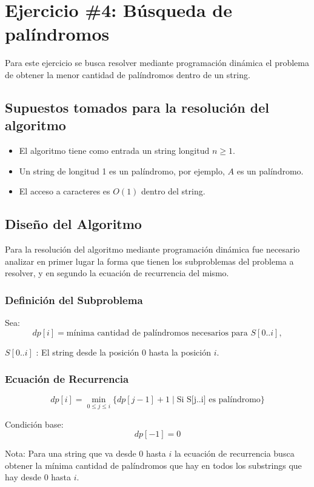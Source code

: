\section{Ejercicio \#4: Búsqueda de palíndromos}

Para este ejercicio se busca resolver mediante programación dinámica el problema de obtener la menor cantidad de palíndromos dentro de un string.

\subsection{Supuestos tomados para la resolución del algoritmo}

\begin{itemize}
    \item El algoritmo tiene como entrada un string longitud $n \geq 1$.
    \item Un string de longitud 1 es un palíndromo, por ejemplo, $A$ es un palíndromo.
    \item El acceso a caracteres es $O(1)$ dentro del string.
\end{itemize}

\subsection{Diseño del Algoritmo}

Para la resolución del algoritmo mediante programación dinámica fue necesario analizar en primer lugar la forma que tienen los subproblemas del
problema a resolver, y en segundo la ecuación de recurrencia del mismo.

\subsubsection{Definición del Subproblema}

Sea:
\[
dp[i] = \text{mínima cantidad de palíndromos necesarios para } S[0..i], 
\]

$S[0..i]$ : El string desde la posición $0$ hasta la posición $i$.


\subsubsection{Ecuación de Recurrencia}
\[
dp[i] = \min_{0 \leq j \leq i} \{ dp[j-1] + 1 \mid \text{Si S[j..i] es palíndromo} \}
\]

Condición base:
\[
dp[-1] = 0
\]

Nota: Para una string que va desde $0$ hasta $i$ la ecuación de recurrencia busca obtener la mínima cantidad de palíndromos que hay en todos
los substrings que hay desde $0$ hasta $i$.

